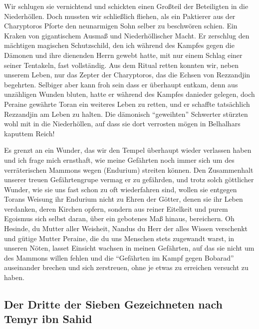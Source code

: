 Wir schlugen sie vernichtend und schickten einen Großteil der Beteiligten in die Niederhöllen. Doch mussten wir schließlich fliehen, als ein Paktierer aus der Charyptoros Pforte den neunarmigen Sohn selber zu beschwören schien. Ein Kraken von gigantischem Ausmaß und Niederhöllischer Macht. Er zerschlug den mächtigen magischen Schutzschild, den ich während des Kampfes gegen die Dämonen und ihre dienenden Herrn gewebt hatte, mit nur einem Schlag einer seiner Tentakeln, fast vollständig. Aus dem Ritual retten konnten wir, neben unserem Leben, nur das Zepter der Charyptoros, das die Echsen von Rezzandjin begehrten. Selbiger aber kann froh sein dass er überhaupt entkam, denn aus unzähligen Wunden bluten, hatte er während des Kampfes danieder gelegen, doch Peraine gewährte Toran ein weiteres Leben zu retten, und er schaffte tatsächlich Rezzandjin am Leben zu halten.
Die dämonisch ``geweihten'' Schwerter stürzten wohl mit in die Niederhöllen, auf dass sie dort verrosten mögen in Belhalhars kaputtem Reich!

Es grenzt an ein Wunder, das wir den Tempel überhaupt wieder verlassen haben und ich frage mich ernsthaft, wie meine Gefährten noch immer sich um des verräterischen Mammons wegen (Endurium) streiten können. Den Zusammenhalt unserer treuen Gefährtengrupe vermag er zu gefährden, und trotz solch göttlicher Wunder, wie sie uns fast schon zu oft wiederfahren sind, wollen sie entgegen Torans Weisung ihr Endurium nicht zu Ehren der Götter, denen sie ihr Leben verdanken, deren Kirchen opfern, sondern aus reiner Eitelkeit und purem Egoismus sich selbst daran, über ein gebotenes Maß hinaus, bereichern. Oh Hesinde, du Mutter aller Weisheit, Nandus du Herr der alles Wissen verschenkt und gütige Mutter Peraine, die du uns Menschen stets zugewandt warst, in unseren Nöten, lasset Einsicht wachsen in meinen Gefährten, auf das sie nicht um des Mammons willen fehlen und die ``Gefährten im Kampf gegen Bobarad'' auseinander brechen und sich zerstreuen, ohne je etwas zu erreichen versucht zu haben.

\subsection{Der Dritte der Sieben Gezeichneten nach Temyr ibn Sahid}

